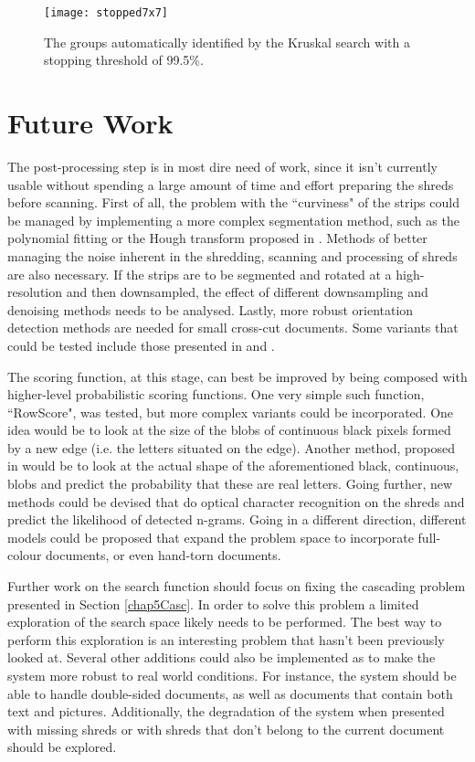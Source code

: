 \begin{figure}[H]
    \centering
    \texttt{[image: stopped7x7]}
    \caption{The groups automatically identified by the Kruskal search with a stopping threshold of 99.5\%.}
    \label{fig:stopped}
\end{figure}

\newpage
\section{Future Work}
The post-processing step is in most dire need of work, since it isn't currently usable without spending a large amount of time and effort preparing the shreds before scanning. First of all, the problem with the ``curviness" of the strips could be managed by implementing a more complex segmentation method, such as the polynomial fitting or the Hough transform proposed in \cite{P26}. Methods of better managing the noise inherent in the shredding, scanning and processing of shreds are also necessary. If the strips are to be segmented and rotated at a high-resolution and then downsampled, the effect of different downsampling and denoising methods needs to be analysed. Lastly, more robust orientation detection methods are needed for small cross-cut documents. Some variants that could be tested include those presented in \cite{P45} and \cite{P46}.

The scoring function, at this stage, can best be improved by being composed with higher-level probabilistic scoring functions. One very simple such function, ``RowScore", was tested, but more complex variants could be incorporated. One idea would be to look at the size of the blobs of continuous black pixels formed by a new edge (i.e. the letters situated on the edge). Another method, proposed in \cite{P8} would be to look at the actual shape of the aforementioned black, continuous, blobs and predict the probability that these are real letters. Going further, new methods could be devised that do optical character recognition on the shreds and predict the likelihood of detected n-grams. Going in a different direction, different models could be proposed that expand the problem space to incorporate full-colour documents, or even hand-torn documents.

Further work on the search function should focus on fixing the cascading problem presented in Section \ref{chap5Casc}. In order to solve this problem a limited exploration of the search space likely needs to be performed. The best way to perform this exploration is an interesting problem that hasn't been previously looked at. Several other additions could also be implemented as to make the system more robust to real world conditions. For instance, the system should be able to handle double-sided documents, as well as documents that contain both text and pictures. Additionally, the degradation of the system when presented with missing shreds or with shreds that don't belong to the current document should be explored.
